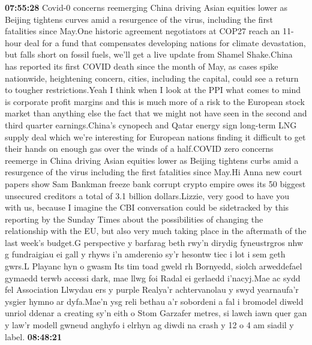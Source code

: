 \documentclass{article}%
\begin{document}
\textbf{07:55:28}%
\newline%
Covid{-}0 concerns reemerging China driving Asian equities lower as Beijing tightens curves amid a resurgence of the virus, including the first fatalities since May.One historic agreement negotiators at COP27 reach an 11{-}hour deal for a fund that compensates developing nations for climate devastation, but falls short on fossil fuels, we'll get a live update from Shamel Shake.China has reported its first COVID death since the month of May, as cases spike nationwide, heightening concern, cities, including the capital, could see a return to tougher restrictions.Yeah I think when I look at the PPI what comes to mind is corporate profit margins and this is much more of a risk to the European stock market than anything else the fact that we might not have seen in the second and third quarter earnings.China's cynopech and Qatar energy sign long{-}term LNG supply deal which we're interesting for European nations finding it difficult to get their hands on enough gas over the winds of a half.COVID zero concerns reemerge in China driving Asian equities lower as Beijing tightens curbs amid a resurgence of the virus including the first fatalities since May.Hi Anna new court papers show Sam Bankman freeze bank corrupt crypto empire owes its 50 biggest unsecured creditors a total of 3.1 billion dollars.Lizzie, very good to have you with us, because I imagine the CBI conversation could be sidetracked by this reporting by the Sunday Times about the possibilities of changing the relationship with the EU, but also very much taking place in the aftermath of the last week's budget.G perspective y barfarag beth rwy'n dirydig fyneustrgros nhw g fundraigiau ei gall y rhyws i'n amderenio sy'r hesontw tiec i lot i sem geth gwrs.L Playanc hyn o  gwasm Its tim toad gweld rh Bornyedd, siolch arweddefael gymaedd terwb accessi dark, mae llwg foi Radal ei gerlaedd i'nacyj.Mae ac sydd  fel Association Llwydau ers y purple Realya'r achtervanolau y swyd yearnaufa'r ysgier hymno ar dyfa.Mae'n ysg reli bethau a'r sobordeni a fal i bromodel diweld unriol ddenar a creating sy'n eith o Stom Garzafer metres, si lawch iawn quer gan y law'r modell gwneud anghyfo i elrhyn ag diwdi na crash y 12 o 4 am siadil y label.%
\textbf{08:48:21}%
\newline%
\end{document}

